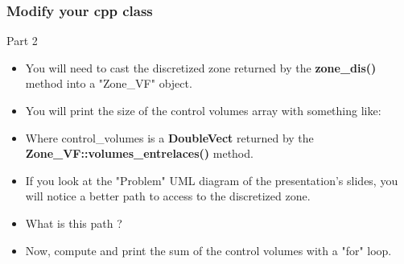 \documentclass[10pt, hyperref={unicode=true,pdfusetitle, bookmarks=true,bookmarksnumbered=false,bookmarksopen=false, breaklinks=false,pdfborder={0 0 1},backref=true,colorlinks=true,linkcolor=darkblue,pageanchor, urlcolor=darkblue}]{beamer}
\begin{document}
\begin{frame}
\frametitle{Modify your cpp class}
\begin{block}{Part 2}

\begin{itemize}
\item You will need to cast the discretized zone returned by the \textbf{zone\_dis()} method into a "Zone\_VF" object.

\item You will print the size of the control volumes array with something like:
\begin{center}
\end{center}

\item Where control\_volumes is a \textbf{DoubleVect} returned by the \textbf{Zone\_VF::volumes\_entrelaces()} method.
\item If you look at the "Problem" UML diagram of the presentation's slides, you will notice a better path to access to the discretized zone.
\item What is this path ?
\item Now, compute and print the sum of the control volumes with a "for" loop.

\end{itemize}

\end{block}
\end{frame}
\end{document}

